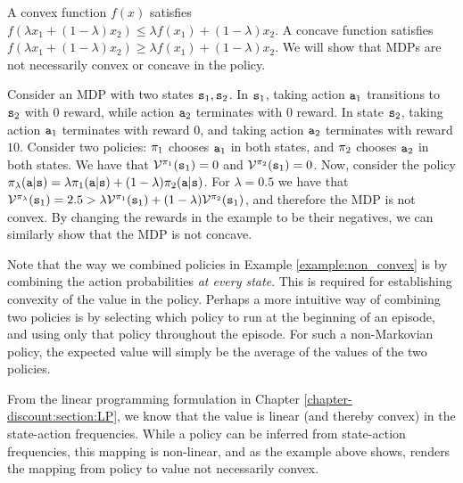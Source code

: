 \begin{example}\label{example:non_convex}
    A convex function $f(x)$ satisfies $f(\lambda x_1 + (1-\lambda) x_2) \leq \lambda f(x_1) + (1-\lambda) x_2$. A concave function satisfies $f(\lambda x_1 + (1-\lambda) x_2) \geq \lambda f(x_1) + (1-\lambda) x_2$.
    We will show that MDPs are not necessarily convex or concave in the policy.

    Consider an MDP with two states ${\tt s}_1, {\tt s}_2$. In ${\tt s}_1$, taking action ${\tt a}_1$ transitions to ${\tt s}_2$ with 0 reward, while action ${\tt a}_2$ terminates with 0 reward. In state ${\tt s}_2$, taking action ${\tt a}_1$ terminates with reward $0$, and taking action ${\tt a}_2$ terminates with reward $10$. Consider two policies: $\pi_1$ chooses ${\tt a}_1$ in both states, and $\pi_2$ chooses ${\tt a}_2$ in both states. We have that $\mathcal{V}^{\pi_1}({\tt s}_1) = 0$ and $\mathcal{V}^{\pi_2}({\tt s}_1) = 0$. 
    Now, consider the policy $\pi_\lambda({\tt a}|{\tt s}) = \lambda \pi_1({\tt a}|{\tt s}) + (1-\lambda)\pi_2({\tt a}|{\tt s})$. For $\lambda=0.5$ we have that $\mathcal{V}^{\pi_\lambda}({\tt s}_1) = 2.5 > \lambda \mathcal{V}^{\pi_1}({\tt s}_1) + (1-\lambda) \mathcal{V}^{\pi_2}({\tt s}_1)$, and therefore the MDP is not convex. 
    By changing the rewards in the example to be their negatives, we can similarly show that the MDP is not concave.
\end{example}

\begin{remark}
    Note that the way we combined policies in Example \ref{example:non_convex} is by combining the action probabilities \textit{at every state}. This is required for establishing convexity of the value in the policy. Perhaps a more intuitive way of combining two policies is by selecting which policy to run at the beginning of an episode, and using only that policy throughout the episode. For such a non-Markovian policy, the expected value will simply be the average of the values of the two policies.
\end{remark}

\begin{remark}
    From the linear programming formulation in Chapter \ref{chapter-discount:section:LP}, we know that the value is linear (and thereby convex) in the state-action frequencies. While a policy can be inferred from state-action frequencies, this mapping is non-linear, and as the example above shows, renders the mapping from policy to value not necessarily convex.
\end{remark}

